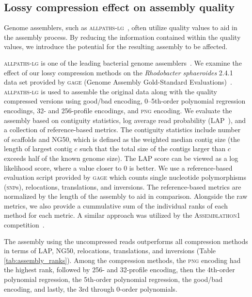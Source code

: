 \documentclass{bioinfo}
\begin{document}
\subsection{Lossy compression effect on assembly quality}


Genome assemblers, such as \textsc{allpaths-lg}~\cite{gnerre2011high}, often utilize quality values to aid in the assembly process. By reducing the information contained within the quality values, we introduce the potential for the resulting assembly to be affected.

\textsc{allpaths-lg} is one of the leading bacterial genome assemblers~\cite{salzberg2012gage}. We examine the effect of our lossy compression methods on the \textit{Rhodobacter sphaeroides} 2.4.1 data set provided by \textsc{gage} (Genome Assembly Gold-Standard Evaluations)~\cite{salzberg2012gage}. \textsc{allpaths-lg} is used to assemble the original data along with the quality compressed versions using good/bad encoding, 0--5th-order polynomial regression encodings, 32- and 256-profile encodings, and \textsc{png} encoding. We evaluate the assembly based on contiguity statistics, log average read probability (LAP~\cite{ghodsi2013novo}), and a collection of reference-based metrics. The contiguity statistics include number of scaffolds and NG50, which is defined as the weighted median contig size (the length of largest contig $c$ such that the total size of the contigs larger than $c$ exceeds half of the known genome size).  The LAP score can be viewed as a log likelihood score, where a value closer to 0 is better. We use a reference-based evaluation script provided by \textsc{gage} which counts single nucleotide polymorphisms (\textsc{snp}s), relocations, translations, and inversions. The reference-based metrics are normalized by the length of the assembly to aid in comparison. Alongside the raw metrics, we also provide a cummulative sum of the individual ranks of each method for each metric. A similar approach was utilized by the \textsc{Assemblathon1} competition~\cite{earl2011assemblathon}.


The assembly using the uncompressed reads outperforms all compression methods in terms of LAP, NG50, relocations, translations, and inversions (Table \ref{tab:assembly_ranks}). Among the compression methods, the \textsc{png} encoding had the highest rank, followed by 256- and 32-profile encoding, then the 4th-order polynomial regression, the 5th-order polynomial regression, the good/bad encoding, and lastly, the 3rd through 0-order polynomials.
\end{document}
